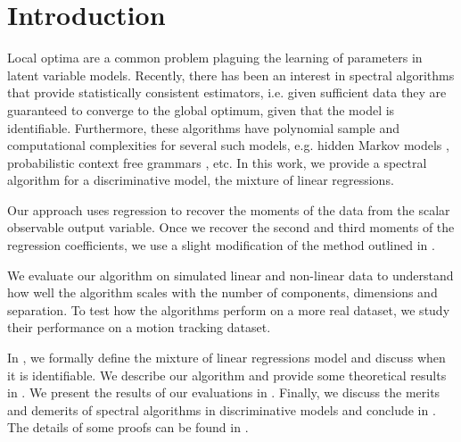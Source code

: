\section{Introduction}
\label{sec:intro}

Local optima are a common problem plaguing the learning of parameters in
latent variable models. Recently, there has been an interest in spectral
algorithms that provide statistically consistent estimators, i.e. given
sufficient data they are guaranteed to converge to the global optimum,
given that the model is identifiable. Furthermore, these algorithms have
polynomial sample and computational complexities for several such
models, e.g.  hidden Markov models \cite{AnandkumarHsuKakade2012},
probabilistic context free grammars \cite{HsuKakadeLiang2012}, etc. In
this work, we provide a spectral algorithm for a discriminative model,
the mixture of linear regressions.


Our approach uses regression to recover the moments of the data from the
scalar observable output variable. Once we recover the second and third
moments of the regression coefficients, we use a slight modification of
the method outlined in \citet{AnandkumarHsuKakade2012}.

% 
We evaluate our algorithm on simulated linear and non-linear data to
understand how well the algorithm scales with the number of components,
dimensions and separation. To test how the algorithms perform on a more
real dataset, we study their performance on a motion tracking dataset.

In , we formally define the mixture of linear
regressions model and discuss when it is identifiable. We describe our
algorithm and provide some theoretical results in . We
present the results of our evaluations in .
Finally, we discuss the merits and demerits of spectral algorithms in
discriminative models and conclude in . The
details of some proofs can be found in .


